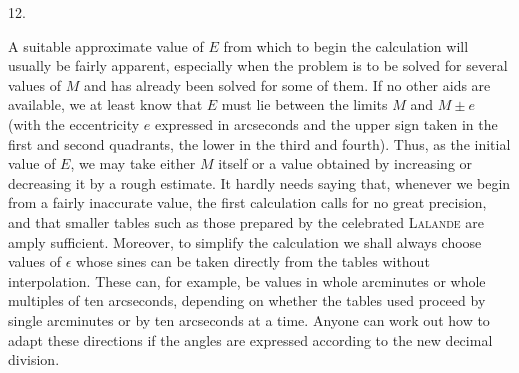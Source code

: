 \par{}
\begin{center}
12.
\end{center}
A suitable approximate value of $E$ from which to begin the calculation will usually be fairly apparent, especially when the problem is to be solved for several values of $M$ and has already been solved for some of them. If no other aids are available, we at least know that $E$ must lie between the limits $M$ and $M \pm e$ (with the eccentricity $e$ expressed in arcseconds and the upper sign taken in the first and second quadrants, the lower in the third and fourth). Thus, as the initial value of $E$, we may take either $M$ itself or a value obtained by increasing or decreasing it by a rough estimate. It hardly needs saying that, whenever we begin from a fairly inaccurate value, the first calculation calls for no great precision, and that smaller tables such as those prepared by the celebrated \textsc{Lalande} are amply sufficient. Moreover, to simplify the calculation we shall always choose values of $\epsilon$ whose sines can be taken directly from the tables without interpolation. These can, for example, be values in whole arcminutes or whole multiples of ten arcseconds, depending on whether the tables used proceed by single arcminutes or by ten arcseconds at a time. Anyone can work out how to adapt these directions if the angles are expressed according to the new decimal division.
